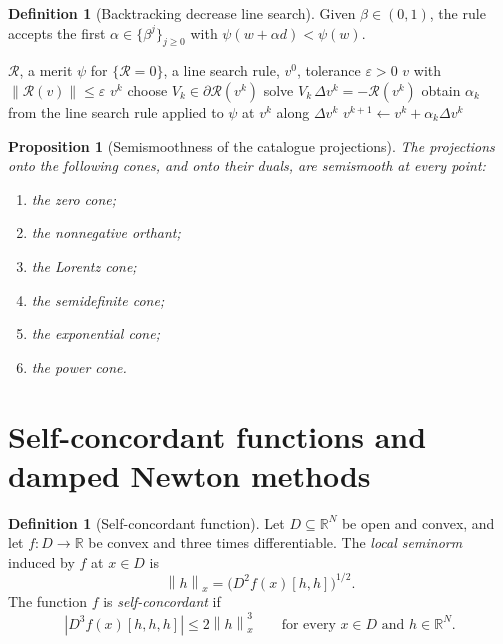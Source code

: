 \documentclass[a4paper,11pt]{book}
\theoremstyle{plain}
\newtheorem{proposition}[theorem]{Proposition}
\theoremstyle{definition}
\newtheorem{definition}[theorem]{Definition}
\theoremstyle{remark}
\numberwithin{equation}{chapter}
\numberwithin{algorithm}{chapter}
\newcommand{\R}{\mathbb{R}}
\newcommand{\norm}[1]{\left\|#1\right\|}
\begin{document}
	\begin{definition}[Backtracking decrease line search]
		Given $\beta\in(0,1)$, the rule accepts the first
		$\alpha\in\{\beta^j\}_{j\geq0}$ with $\psi(w+\alpha d)<\psi(w)$.
	\end{definition}
	
	\begin{algorithm}[H]
		\caption{Semismooth Newton method with a line search on a merit function}
		\begin{algorithmic}[1]
			\Require $\mathcal{R}$, a merit $\psi$ for $\{\mathcal{R}=0\}$, a line search
			rule, $v^0$, tolerance $\varepsilon>0$
			\Ensure $v$ with $\norm{\mathcal{R}(v)}\leq\varepsilon$
			\If{$\norm{\mathcal{R}(v^k)}\leq\varepsilon$} \State \Return $v^k$ \EndIf
			\State choose $V_k\in\partial\mathcal{R}(v^k)$
			\State solve $V_k\,\Delta v^k=-\mathcal{R}(v^k)$
			\State obtain $\alpha_k$ from the line search rule applied to $\psi$ at $v^k$
			along $\Delta v^k$
			\State $v^{k+1}\gets v^k+\alpha_k\Delta v^k$
			\EndFor
		\end{algorithmic}
	\end{algorithm}
	
	
	
	\begin{proposition}[Semismoothness of the catalogue projections]
		The projections onto the following cones, and onto their duals, are
		semismooth at every point:
		
		\begin{enumerate}
			\item the zero cone;
			\item the nonnegative orthant;
			\item the Lorentz cone;
			\item the semidefinite cone;
			\item the exponential cone;
			\item the power cone.
		\end{enumerate}
	\end{proposition}
	
	\section{Self-concordant functions and damped Newton methods}
	
	\begin{definition}[Self-concordant function]
		Let \(D\subseteq\R^N\) be open and convex, and let
		\(f:D\to\R\) be convex and three times differentiable. The \emph{local
			seminorm} induced by \(f\) at \(x\in D\) is
		\begin{equation}
			\norm{h}_x
			=
			\bigl(D^2f(x)[h,h]\bigr)^{1/2}.
		\end{equation}
		The function \(f\) is \emph{self-concordant} if
		\begin{equation}
			\left|D^3f(x)[h,h,h]\right|
			\leq
			2\norm{h}_x^3
			\qquad
			\text{for every }x\in D\text{ and }h\in\R^N.
		\end{equation}
	\end{definition}
	
\end{document}
